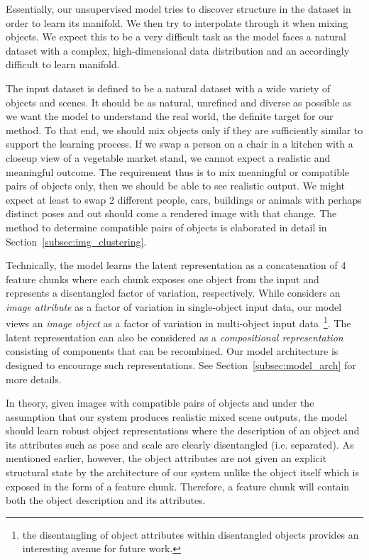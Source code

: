 \documentclass[12pt,a4paper]{article}
\begin{document}
Essentially, our unsupervised model tries to discover structure in the dataset in order to learn its manifold. We then try to interpolate through it when mixing objects. We expect this to be a very difficult task as the model faces a natural dataset with a complex, high-dimensional data distribution and an accordingly difficult to learn manifold. 

The input dataset is defined to be a natural dataset with a wide variety of objects and scenes. It should be as natural, unrefined and diverse as possible as we want the model to understand the real world, the definite target for our method. To that end, we should mix objects only if they are sufficiently similar to support the learning process. If we swap a person on a chair in a kitchen with a closeup view of a vegetable market stand, we cannot expect a realistic and meaningful outcome. The requirement thus is to mix meaningful or compatible pairs of objects only, then we should be able to see realistic output. We might expect at least to swap 2 different people, cars, buildings or animals with perhaps distinct poses and out should come a rendered image with that change. The method to determine compatible pairs of objects is elaborated in detail in Section~\ref{subsec:img_clustering}. 

Technically, the model learns the latent representation as a concatenation of 4 feature chunks where each chunk exposes one object from the input and represents a disentangled factor of variation, respectively. While \cite{DisentFacOfVarByMixTh} considers an \textit{image attribute} as a factor of variation in single-object input data, our model views an \textit{image object} as a factor of variation in multi-object input data~\footnote{the disentangling of object attributes within disentangled objects provides an interesting avenue for future work.}. The latent representation can also be considered as a \textit{compositional representation}~\cite{SpatialBDecoder} consisting of components that can be recombined. %
Our model architecture is designed to encourage such representations. See Section~\ref{subsec:model_arch} for more details. 

In theory, given images with compatible pairs of objects and under the assumption that our system produces realistic mixed scene outputs, the model should learn robust object representations where the description of an object and its attributes such as pose and scale are clearly disentangled (i.e. separated). As mentioned earlier, however, the object attributes are not given an explicit structural state by the architecture of our system unlike the object itself which is exposed in the form of a feature chunk. Therefore, a feature chunk will contain both the object description and its attributes.
\end{document}
